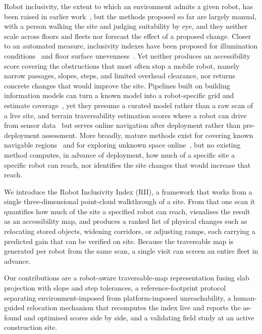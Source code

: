 \documentclass[a4paper, 10pt, conference]{ieeeconf}
\begin{document}
Robot inclusivity, the extent to which an environment admits a given robot, has been raised in earlier work~\cite{robot_inclusivity_2013,buildings14051193}, but the methods proposed so far are largely manual, with a person walking the site and judging suitability by eye, and they neither scale across floors and fleets nor forecast the effect of a proposed change. Closer to an automated measure, inclusivity indexes have been proposed for illumination conditions~\cite{zeng2024riilux} and floor surface unevenness~\cite{borusu2024rilsu}. Yet neither produces an accessibility score covering the obstructions that most often stop a mobile robot, namely narrow passages, slopes, steps, and limited overhead clearance, nor returns concrete changes that would improve the site. Pipelines built on building information models can turn a known model into a robot-specific grid and estimate coverage~\cite{chen2024bimcpp}, yet they presume a curated model rather than a raw scan of a live site, and terrain traversability estimation scores where a robot can drive from sensor data~\cite{papadakis2013terrain} but serves online navigation after deployment rather than pre-deployment assessment. More broadly, mature methods exist for covering known navigable regions~\cite{gabriely2001spanning,choset1998boustrophedon,galceran2013survey} and for exploring unknown space online~\cite{yamauchi1997frontier,zelinsky1993planning}, but no existing method computes, in advance of deployment, how much of a specific site a specific robot can reach, nor identifies the site changes that would increase that reach.

We introduce the Robot Inclusivity Index (RII), a framework that works from a single three-dimensional point-cloud walkthrough of a site. From that one scan it quantifies how much of the site a specified robot can reach, visualises the result as an accessibility map, and produces a ranked list of physical changes such as relocating stored objects, widening corridors, or adjusting ramps, each carrying a predicted gain that can be verified on site. Because the traversable map is generated per robot from the same scan, a single visit can screen an entire fleet in advance.

Our contributions are a robot-aware traversable-map representation fusing slab projection with slope and step tolerances, a reference-footprint protocol separating environment-imposed from platform-imposed unreachability, a human-guided relocation mechanism that recomputes the index live and reports the as-found and optimised scores side by side, and a validating field study at an active construction site.
\end{document}
